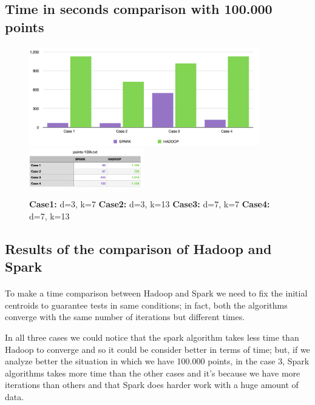 \documentclass{book}
\begin{document}
    \subsection{Time in seconds comparison with 100.000 points}
    \paragraph{}

    \begin{figure}[H]
        \includegraphics[width=10cm]{hadoop+spark/grafico_points100k}
        \includegraphics[width=5cm]{hadoop+spark/tabella_point100k}
        \centering
        \caption{\footnotesize{\textbf{Case1:} d=3, k=7 \textbf{Case2:} d=3, k=13 \textbf{Case3:} d=7, k=7 \textbf{Case4:} d=7, k=13}}
    \end{figure}

    \subsection{Results of the comparison of Hadoop and Spark}
    \paragraph{}

    To make a time comparison between Hadoop and Spark we need to fix the initial centroids to guarantee tests in same conditions; in fact, both the algorithms converge with the same number of iterations but different times. 

    In all three cases we could notice that the spark algorithm takes less time than Hadoop to converge and so it could be consider better in terms of time; but, if we analyze better the situation in which we have 100.000 points, in the case 3,  Spark algorithms takes more time than the other cases and it's because we have more iterations than others and that Spark does harder work with a huge amount of data. 
\end{document}
